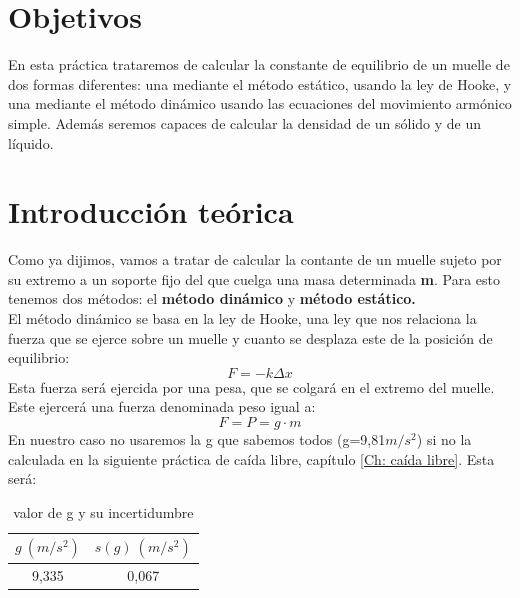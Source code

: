 \documentclass[12pt,a4paper]{book}
\begin{document}
\section{Objetivos} \label{sec:muelle-objetivos}


En esta práctica trataremos de calcular la constante de equilibrio de un muelle de dos formas diferentes: una mediante el método estático, usando la ley de Hooke, y una mediante el método dinámico usando las ecuaciones del movimiento armónico simple. Además seremos capaces de calcular la densidad de un sólido y de un líquido. 

\section{Introducción teórica}


Como ya dijimos, vamos a tratar de calcular la contante de un muelle sujeto por su extremo a un soporte fijo del que cuelga una masa determinada \textbf{m}. Para esto tenemos dos métodos: el \textbf{método dinámico} y \textbf{método estático.} \\

El método dinámico se basa en la ley de Hooke, una ley que nos relaciona la fuerza que se ejerce sobre un muelle y cuanto se desplaza este de la posición de equilibrio:
\begin{equation}
F=-k \Delta x
\label{Ec: muelle ley de hooke}
\end{equation}
Esta fuerza será ejercida por una pesa, que se colgará en el extremo del muelle. Este ejercerá una fuerza denominada peso igual a:
\begin{equation}
F=P=g\cdot m
\label{Ec: muelle peso muelle}
\end{equation}
En nuestro caso no usaremos la g que sabemos todos (g=9,81$m/s^2$) si no la calculada en la siguiente práctica de caída libre, capítulo \ref{Ch: caída libre}. Esta será:
\begin{table}[h] %
\begin{center}
\begin{tabular}{|c|c|}
\hline
$g \ (m/s^2)$ & 	 $s(g) \ (m/s^2)$  \\ \hline
9,335 & 	 0,067 \\  \hline
\end{tabular}
\label{Tab:caida libre-datos para calcular g - muelle}
\caption{valor de g y su incertidumbre}
\end{center}
\end{table}
\end{document}
